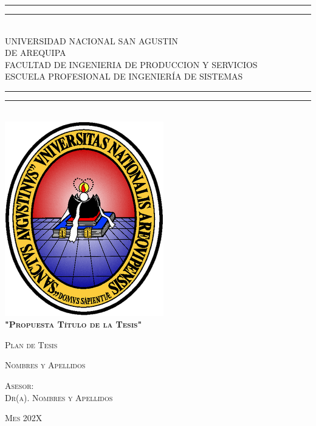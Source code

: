
\begin{center}
\rule[0.5ex]{\linewidth}{2pt}\vspace*{-\baselineskip}\vspace*{3.2pt}
\rule[0.5ex]{\linewidth}{1pt}\\[\baselineskip]
{\huge UNIVERSIDAD NACIONAL SAN AGUSTIN} \\\vspace{4mm}
{\huge DE AREQUIPA }\\[6mm]
{\Large {FACULTAD DE INGENIERIA DE PRODUCCION Y SERVICIOS}}\\\vspace{3mm}
{\Large {ESCUELA PROFESIONAL DE INGENIERÍA DE SISTEMAS}}\\\vspace{3mm}
\rule[0.5ex]{\linewidth}{1pt}\vspace*{-\baselineskip}\vspace{3.2pt}
\rule[0.5ex]{\linewidth}{2pt}\\

\vspace{4mm}
\includegraphics[scale=0.5]{Imagenes/unsa.png}\\
\vspace{4mm}
{\large \textsc{\textbf{"Propuesta Título de la Tesis"}}}\\
\vspace{6mm}

{\large\textsc{ Plan de Tesis}}\\
\vspace{2mm}

{\large\textsc{Nombres y Apellidos }}\\
\vspace{6mm}

{\large \textsc{Asesor:}}\\
\vspace{1mm}
{\large\textsc{Dr(a). Nombres y Apellidos}}\\
\vspace{9mm}


\vspace{4mm}
{\large\textsc{Mes 202X}}

\end{center}
